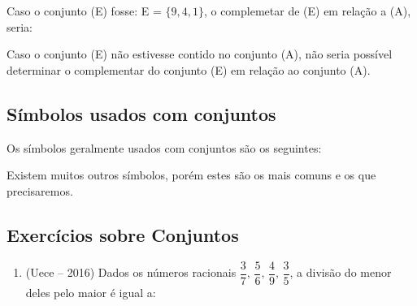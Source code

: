 \begin{multicols*}{2}
	Caso o conjunto (E) fosse: E = $\{9, 4, 1\}$, o complemetar de (E) em relação a (A), seria:
	
	
	Caso o conjunto (E) não estivesse contido no conjunto (A), não seria possível determinar o complementar do conjunto (E) em relação ao conjunto (A).
   
	\subsection{Símbolos usados com conjuntos}  		       
   
	Os símbolos geralmente usados com conjuntos são os seguintes:\\
	
	
	
	
	
	
	
	
	
	
	
	
	
	Existem muitos outros símbolos, porém estes são os mais comuns e os que precisaremos.
	

	\subsection{Exercícios sobre Conjuntos}

\begin{enumerate}
	
\item (Uece – 2016) Dados os números racionais $ \dfrac{3}{7},\, \dfrac{5}{6},\, \dfrac{4}{9},\, \dfrac{3}{5}$, a divisão do menor deles pelo maior é igual a: 
	

\end{enumerate}
\end{multicols*}
